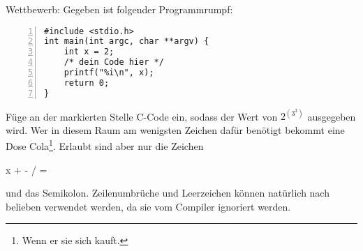 \documentclass{../uebungszettel}
\begin{document}
\begin{aufg}
Wettbewerb: Gegeben ist folgender Programmrumpf:
\begin{codelisting}
\begin{lstlisting}[numbers=left,numberstyle=\tiny,frame=tlrb]
#include <stdio.h>
int main(int argc, char **argv) {
	int x = 2;
	/* dein Code hier */
	printf("%i\n", x);
	return 0;
}
\end{lstlisting}
\end{codelisting}
Füge an der markierten Stelle C-Code ein, sodass der Wert von $2^{\left(3^3\right)}$ ausgegeben wird. Wer in diesem Raum am wenigsten Zeichen dafür benötigt bekommt eine Dose Cola\footnote{Wenn er sie sich kauft.}. Erlaubt sind aber nur die Zeichen 
\begin{center}
	x \quad + \quad - \quad * \quad / \quad =
\end{center}
und das Semikolon. Zeilenumbrüche und Leerzeichen können natürlich nach belieben verwendet werden, da sie vom Compiler ignoriert werden.
\end{aufg}


\end{document}
